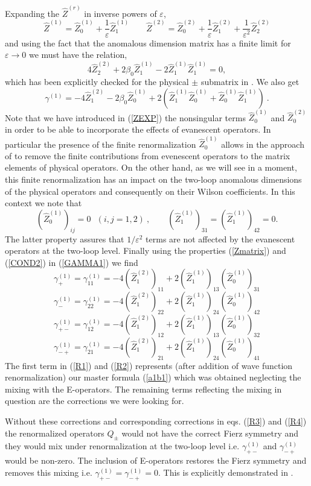 \documentclass[12pt]{article}
\newcommand{\be}{\begin{equation}}
\newcommand{\ee}{\end{equation}}
\begin{document}
\begin{itemize}
\begin{itemize}
 Expanding the $\hat Z^{(r)}$ in inverse powers of $\varepsilon$,
\be\label{ZEXP}
\hat Z^{(1)}= \hat Z_0^{(1)}+\frac{1}{\varepsilon} \hat Z_1^{(1)}
\quad\quad
\hat Z^{(2)}= \hat Z_0^{(2)}+\frac{1}{\varepsilon} \hat Z_1^{(2)}
+\frac{1}{\varepsilon^2} \hat Z_2^{(2)}
\ee
 and using the fact that the anomalous dimension
 matrix has a finite limit for
 $\varepsilon \rightarrow 0$
 we must have the relation,
\be\label{COND}
4 \hat Z^{(2)}_{2} + 2\beta_{0} \hat Z^{(1)}_{1} - 
2 \hat Z^{(1)}_{1} \hat Z^{(1)}_{1}=0,
\ee
 which has been explicitly checked for the physical $\pm$ submatrix
in \cite{WEISZ}.
We also get
\be\label{GAMMA1}
\gamma^{(1)}=-4 \hat Z^{(2)}_1-2\beta_0 \hat Z^{(1)}_0
   + 2 (\hat Z^{(1)}_1 \hat Z^{(1)}_0+\hat Z^{(1)}_0 \hat Z^{(1)}_1)~.
\ee
Note that we have introduced in (\ref{ZEXP}) the nonsingular terms 
$\hat Z_0^{(1)}$ and $\hat Z_0^{(2)}$ in order to be able to incorporate
the effects of evanescent operators.
In particular the presence of the finite renormalization $\hat Z_0^{(1)}$
allows in the approach of \cite{WEISZ} to remove the finite contributions
from evenescent operators to the matrix elements of physical operators.
On the other hand, as we will see in a moment, this finite renormalization
has an impact on the two-loop anomalous dimensions of the physical operators
and consequently on their Wilson coefficients.
In this  context we note that
\be\label{COND2}
 (\hat Z^{(1)}_0)_{ij} = 0~~~(i,j=1,2)~,
\quad\quad
   (\hat Z^{(1)}_{1})_{3 1} = (\hat Z^{(1)}_{1})_{4 2} = 0.
\ee
The latter property assures that $1/\varepsilon^2$ terms are not
affected by the evanescent operators at the two-loop level.
Finally using the properties (\ref{Zmatrix}) and (\ref{COND2}) in 
(\ref{GAMMA1})
we find
\be\label{R1}
 \gamma^{(1)}_{+}=\gamma^{(1)}_{11}=
   -4(\hat Z^{(2)}_1)_{11}+2(\hat Z^{(1)}_1)_{13}(\hat Z^{(1)}_0)_{31}
\ee
\be\label{R2}
 \gamma^{(1)}_{-}=\gamma^{(1)}_{22}=
   -4(\hat Z^{(2)}_1)_{22}+2(\hat Z^{(1)}_1)_{24}(\hat Z^{(1)}_0)_{42}
\ee
\be\label{R3}
\gamma^{(1)}_{+-}=\gamma^{(1)}_{12}=
   -4(\hat Z^{(2)}_1)_{12}+2(\hat Z^{(1)}_1)_{13}(\hat Z^{(1)}_0)_{32}
\ee
\be\label{R4}
\gamma^{(1)}_{-+}=\gamma^{(1)}_{21}=
   -4(\hat Z^{(2)}_1)_{21}+2(\hat Z^{(1)}_1)_{24}(\hat Z^{(1)}_0)_{41}
\ee
 The first term in  (\ref{R1}) and (\ref{R2}) 
represents (after addition of wave function renormalization)
 our master formula (\ref{a1b1}) 
which was obtained neglecting the mixing with the E-operators.
 The remaining 
terms reflecting the mixing in question are the corrections we
 were looking for.

Without these corrections and corresponding corrections
 in eqs. (\ref{R3}) and (\ref{R4}) the renormalized operators $Q_\pm$
would not have  the correct Fierz symmetry 
and they would mix under renormalization at the two-loop level
 i.e. $\gamma^{(1)}_{+-}$ and $\gamma^{(1)}_{-+}$ 
would be non-zero. The inclusion of E-operators restores the
 Fierz symmetry and removes this mixing i.e.
 $ \gamma^{(1)}_{+-}=\gamma^{(1)}_{-+}=0$. This is explicitly
demonstrated in \cite{WEISZ}.


\end{itemize}
\end{itemize}
\end{document}
